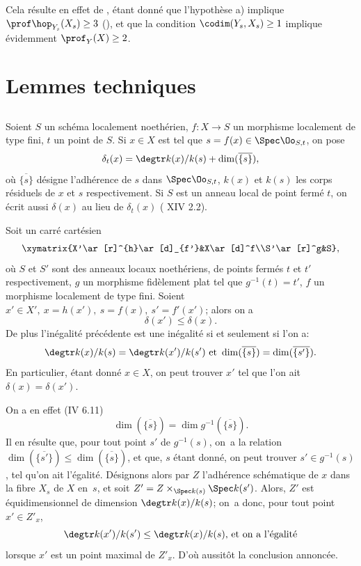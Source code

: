 Cela r\'esulte en effet de , \'etant donn\'e que l'hypoth\`ese a) implique $\prof\hop_{Y_s}(X_s)\geq 3$ (\cf {}), et que la condition $\codim(Y_s, X_s)\geq 1$ implique \'evidemment $\prof_Y(X)\geq 2$.

\section{Lemmes techniques} \label{XIV.2}

\subsection{} \label{XIV.2.1}
Soient $S$ un sch\'ema localement noeth\'erien, $f:X\to S$ un morphisme localement de type fini, $t$ un point de $S$. Si $x\in X$ est tel que $s=f(x)\in\Spec\Oo_{S, t}$, on pose
$$
\delta_t(x)=\degtr k(x)/k(s)+\dim(\overline{\{s\}}),
$$
o\`u $\overline{\{s\}}$ d\'esigne l'adh\'erence de $s$ dans $\Spec\Oo_{S, t}$, $k(x)$ et $k(s)$ les corps r\'esiduels de $x$ et $s$ respectivement. Si $S$ est un anneau local de point ferm\'e $t$, on \'ecrit aussi $\delta(x)$ au lieu de $\delta_t(x)$ (\cf {} XIV 2.2).
\begin{sublemme} \label{XIV.2.1.1} Soit un carr\'e cart\'esien
$$
\xymatrix{X'\ar[r]^{h}\ar[d]_{f'}&X\ar[d]^f\\S'\ar[r]^g&S},
$$
o\`u $S$ et $S'$ sont des anneaux locaux noeth\'eriens, de points ferm\'es $t$ et $t'$ respectivement, $g$ un morphisme fid\`element plat tel que $g^{-1}(t)=t'$\pageoriginale, $f$ un morphisme localement de type fini. Soient $x'\in X',\ x=h(x'),\ s=f(x),\ s'=f'(x')$; alors on a
$$
\delta(x')\leq\delta(x).
$$
De plus l'in\'egalit\'e pr\'ec\'edente est une in\'egalit\'e si et seulement si l'on a:
$$
\degtr k(x)/k(s)=\degtr k(x')/k(s')\text{ et }\dim(\overline{\{s\}})=\dim(\overline{\{s'\}}).
$$
En particulier, \'etant donn\'e $x\in X$, on peut trouver $x'$ tel que l'on ait $\delta(x)=\delta(x')$.
\end{sublemme}

On a en effet (\EGA IV 6.11)
$$
\dim(\overline{\{s\}})=\dim g^{-1}(\overline{\{s\}}).
$$
Il en r\'esulte que, pour tout point $s'$ de $g^{-1}(s)$, on~a la relation $\dim(\overline{\{s'\}})\leq \dim(\overline{\{s\}})$, et que, $s$ \'etant donn\'e, on peut trouver $s'\in g^{-1}(s)$, tel qu'on ait l'\'egalit\'e. D\'esignons alors par $Z$ l'adh\'erence sch\'ematique de $x$ dans la fibre $X_s$ de $X$ en~$s$, et soit $Z'=Z\times_{\Spec k(s)}\Spec k(s')$. Alors, $Z'$ est \'equidimensionnel de dimension $\degtr k(x)/k(s)$; on~a donc, pour tout point $x'\in Z'_{x}$,
$$
\degtr k(x')/k(s')\leq\degtr k(x)/k(s)\text{, et on~a l'\'egalit\'e}$$
lorsque $x'$ est un point maximal de $Z'_x$. D'o\`u aussit\^{o}t la conclusion annonc\'ee.

